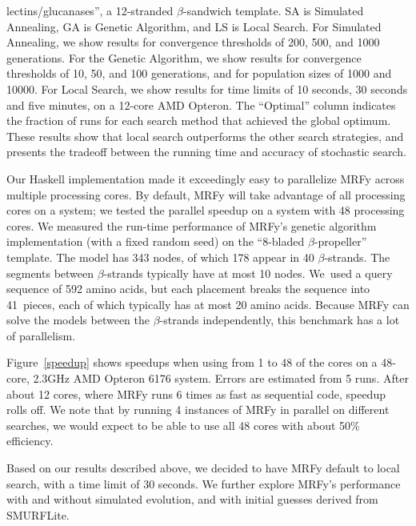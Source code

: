 \documentclass{acm_proc_article-sp}
\begin{document}
\begin{small}
\begin{table}[!t]
{lectins/glucanases'', a 12-stranded $\beta$-sandwich template. 
SA is Simulated Annealing, GA is Genetic Algorithm, and LS is Local
Search. 
For Simulated Annealing, we show results for convergence thresholds of
200, 500, and 1000 generations. 
For the Genetic Algorithm, we show results for convergence thresholds of 10, 
50, and 100 generations, and for population sizes of 1000 and 10000.
For Local Search, we show results for time limits of 10 seconds, 30 seconds and 
five minutes, on a 12-core AMD Opteron.
The ``Optimal'' column indicates the fraction of runs for each search method
that achieved the global optimum.
These results show that local search outperforms the other search strategies,
and presents the tradeoff between the running time and accuracy of stochastic 
search.}
\end{table}
\end{small}




Our Haskell implementation made it exceedingly easy to parallelize MRFy across
multiple processing cores.
By default, MRFy will take advantage of all processing cores on a system; we
tested the parallel speedup on a system with 48 processing cores.
We measured the run-time performance of MRFy's genetic algorithm implementation
(with a fixed random seed) on the ``8-bladed $\beta$-propeller'' template.
The model has 343 nodes, of which 178 appear in 40 $\beta$-strands.
The segments between $\beta$-strands typically have at most 10 nodes.
We~used a query sequence of 592 amino acids, but each placement breaks
the sequence into 41~pieces, each of which typically has at most 20 amino
acids.
Because MRFy can solve the models between the $\beta$-strands independently,
this benchmark has a lot of parallelism.

Figure~\ref{speedup} shows speedups when using from 
 1 to 48 of the cores 
on a 48-core, 2.3GHz AMD Opteron 6176 system.
Errors are estimated from 5 runs.
After about 12 cores, where MRFy runs 6 times as fast as sequential code, 
speedup rolls off.
We note that by running 4 instances of MRFy in parallel on different searches,
we would expect to be able to use all 48 cores with about 50\% efficiency.

Based on our results described above, we decided to have MRFy default to local 
search, with a time limit of 30 seconds.
We further explore MRFy's performance with and without simulated evolution,
and with initial guesses derived from SMURFLite.
\end{document}

